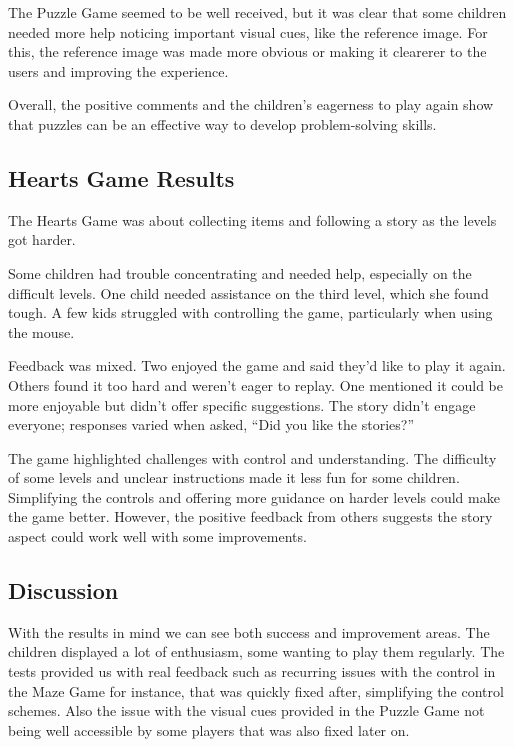 The Puzzle Game seemed to be well received, but it was clear that some children needed more help noticing important visual cues, like the reference image. For this, the reference image was made more obvious or making it clearerer to the users and improving the experience.

Overall, the positive comments and the children’s eagerness to play again show that puzzles can be an effective way to develop problem-solving skills.

\subsection{Hearts Game Results}

The Hearts Game was about collecting items and following a story as the levels got harder.

Some children had trouble concentrating and needed help, especially on the difficult levels. One child needed assistance on the third level, which she found tough. A few kids struggled with controlling the game, particularly when using the mouse.

Feedback was mixed. Two enjoyed the game and said they’d like to play it again. Others found it too hard and weren’t eager to replay. One mentioned it could be more enjoyable but didn’t offer specific suggestions. The story didn’t engage everyone; responses varied when asked, “Did you like the stories?”

The game highlighted challenges with control and understanding. The difficulty of some levels and unclear instructions made it less fun for some children. Simplifying the controls and offering more guidance on harder levels could make the game better. However, the positive feedback from others suggests the story aspect could work well with some improvements.

\newpage
\subsection{Discussion}

With the results in mind we can see both success and improvement areas. The children displayed a lot of enthusiasm, some wanting to play them regularly. The tests provided us with real feedback such as recurring issues with the control in the Maze Game for instance, that was quickly fixed after, simplifying the control schemes. Also the issue with the visual cues provided in the Puzzle Game not being well accessible by some players that was also fixed later on.


